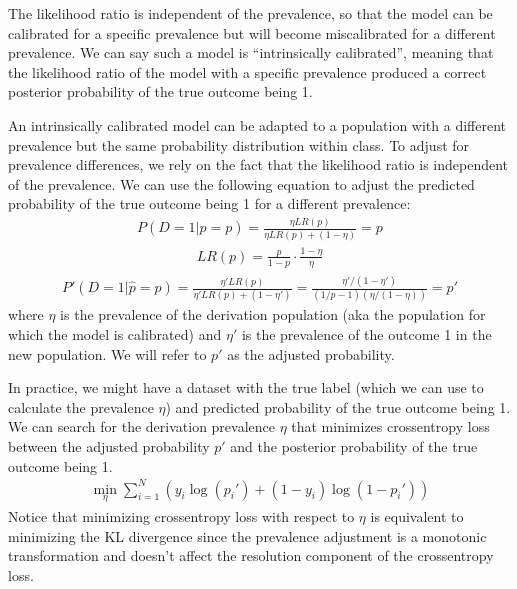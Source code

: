 \documentclass[letterpaper,10pt,english]{sphinxmanual}
\begin{document}
\sphinxAtStartPar
The likelihood ratio is independent of the prevalence, so that the model can be calibrated for a specific prevalence but will become mis\sphinxhyphen{}calibrated for a different prevalence. We can say such a model is “intrinsically calibrated”, meaning that the likelihood ratio of the model with a specific prevalence produced a correct posterior probability of the true outcome being 1.

\sphinxAtStartPar
An intrinsically calibrated model can be adapted to a population with a different prevalence but the same probability distribution within class. To adjust for prevalence differences, we rely on the fact that the likelihood ratio is independent of the prevalence. We can use the following equation to adjust the predicted probability of the true outcome being 1 for a different prevalence:
\begin{equation*}
\begin{split}P(D=1|\hat{p}=p) = \frac{\eta LR(p)}{\eta LR(p) + (1-\eta)} = p\end{split}
\end{equation*}\begin{equation*}
\begin{split}LR(p) = \frac{p}{1-p} \cdot \frac{1-\eta}{\eta}\end{split}
\end{equation*}\begin{equation*}
\begin{split}P'(D=1|\hat{p}=p) = \frac{\eta' LR(p)}{\eta' LR(p) + (1-\eta')} = \frac{\eta'/(1-\eta')}{(1/p-1)(\eta/(1-\eta))} = p'\end{split}
\end{equation*}
\sphinxAtStartPar
where \(\eta\) is the prevalence of the derivation population (aka the population for which the model is calibrated) and \(\eta'\) is the prevalence of the outcome 1 in the new population. We will refer to \(p'\) as the adjusted probability.

\sphinxAtStartPar
In practice, we might have a dataset with the true label (which we can use to calculate the prevalence \(\eta\)) and predicted probability of the true outcome being 1. We can search for the derivation prevalence \(\eta\) that minimizes cross\sphinxhyphen{}entropy loss between the adjusted probability \(p'\) and the posterior probability of the true outcome being 1.
\begin{equation*}
\begin{split}\min_{\eta} \sum_{i=1}^{N} \left(y_i \log(p_i') + (1-y_i) \log(1-p_i')\right)\end{split}
\end{equation*}
\sphinxAtStartPar
Notice that minimizing cross\sphinxhyphen{}entropy loss with respect to \(\eta\) is equivalent to minimizing the KL divergence since the prevalence adjustment is a monotonic transformation and doesn’t affect the resolution component of the cross\sphinxhyphen{}entropy loss.
\end{document}
